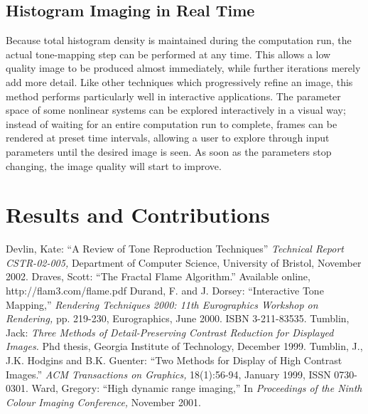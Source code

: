 \documentclass[letterpaper, 11pt]{article}
\begin{document}
\subsection{Histogram Imaging in Real Time}
Because total histogram density is maintained during the computation run, the actual
tone-mapping step can be performed at any time.  This allows a low quality image to
be produced almost immediately, while further iterations merely add more detail.  Like
other techniques which progressively refine an image, this method performs particularly
well in interactive applications.  The parameter space of some nonlinear systems can be
explored interactively in a visual way; instead of waiting for an entire computation run
to complete, frames can be rendered at preset time intervals, allowing a user to explore
through input parameters until the desired image is seen.  As soon as the parameters
stop changing, the image quality will start to improve.


\section{Results and Contributions}

\begin{thebibliography}{77}
 Devlin, Kate: ``A Review of Tone Reproduction Techniques'' {\it Technical Report CSTR-02-005,} Department of Computer Science, University of Bristol, November 2002.
 Draves, Scott: ``The Fractal Flame Algorithm.'' Available online, http://flam3.com/flame.pdf
 Durand, F. and J. Dorsey: ``Interactive Tone Mapping,'' {\it Rendering Techniques 2000: 11th Eurographics Workshop on Rendering,} pp. 219-230, Eurographics, June 2000. ISBN 3-211-83535.
 Tumblin, Jack: {\it Three Methods of Detail-Preserving Contrast Reduction for Displayed Images.} Phd thesis, Georgia Institute of Technology, December 1999.
 Tumblin, J., J.K. Hodgins and B.K. Guenter: ``Two Methods for Display of High Contrast Images.'' {\it ACM Transactions on Graphics,} 18(1):56-94, January 1999, ISSN 0730-0301.
 Ward, Gregory: ``High dynamic range imaging,'' In {\it Proceedings of the Ninth Colour Imaging Conference,} November 2001.
\end{thebibliography}
\end{document}
